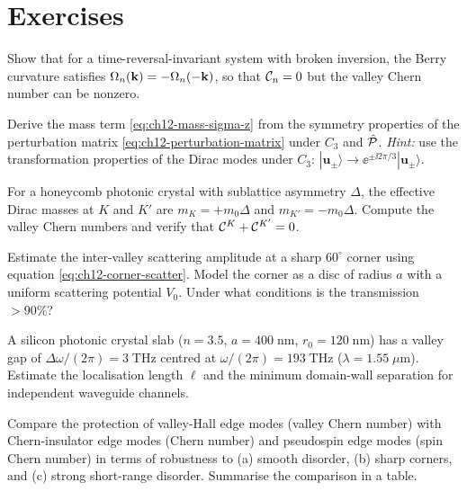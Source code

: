 \section*{Exercises}

\begin{exercise}
  Show that for a time-reversal-invariant system with broken inversion,
  the Berry curvature satisfies $\Omega_n(\mathbf{k})=-\Omega_n(-\mathbf{k})$,
  so that $\mathcal{C}_n=0$ but the valley Chern number can be nonzero.
\end{exercise}

\begin{exercise}
  Derive the mass term \eqref{eq:ch12-mass-sigma-z} from the
  symmetry properties of the perturbation matrix
  \eqref{eq:ch12-perturbation-matrix} under $C_3$ and $\hat{\mathcal{P}}$.
  \emph{Hint:} use the transformation properties of the Dirac modes
  under $C_3$: $|\mathbf{u}_\pm\rangle\to\ee^{\pm\ii 2\pi/3}
  |\mathbf{u}_\pm\rangle$.
\end{exercise}

\begin{exercise}
  For a honeycomb photonic crystal with sublattice asymmetry $\Delta$,
  the effective Dirac masses at $K$ and $K'$ are $m_K=+m_0\Delta$
  and $m_{K'}=-m_0\Delta$.  Compute the valley Chern numbers and
  verify that $\mathcal{C}^K+\mathcal{C}^{K'}=0$.
\end{exercise}

\begin{exercise}
  Estimate the inter-valley scattering amplitude at a sharp $60^\circ$
  corner using equation \eqref{eq:ch12-corner-scatter}.  Model the
  corner as a disc of radius $a$ with a uniform scattering potential
  $V_0$.  Under what conditions is the transmission $>90\%$?
\end{exercise}

\begin{exercise}
  A silicon photonic crystal slab ($n=3.5$, $a=400\;\mathrm{nm}$,
  $r_0=120\;\mathrm{nm}$) has a valley gap of
  $\Delta\omega/(2\pi)=3\;\mathrm{THz}$ centred at
  $\omega/(2\pi)=193\;\mathrm{THz}$ ($\lambda=1.55\;\mu\mathrm{m}$).
  Estimate the localisation length $\ell$ and the minimum domain-wall
  separation for independent waveguide channels.
\end{exercise}

\begin{exercise}
  Compare the protection of valley-Hall edge modes (valley Chern
  number) with Chern-insulator edge modes (Chern number) and
  pseudospin edge modes (spin Chern number) in terms of robustness
  to (a) smooth disorder, (b) sharp corners, and (c) strong
  short-range disorder.  Summarise the comparison in a table.
\end{exercise}
